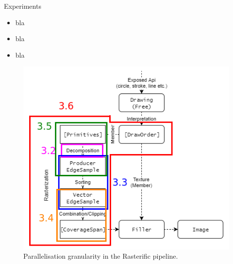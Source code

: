 \documentclass[slidestop,compress,mathserif, xcolor=table]{beamer}
\begin{document}
\begin{frame}[c]{Experiments}
  \begin{itemize}
  \item bla
  \item bla
  \item bla
  \end{itemize}

  \begin{figure}[H]
  \centering
  \includegraphics[width=.4\linewidth]{../rasterific-pipeline-flot}
  \caption{Parallelisation granularity in the Rasterific pipeline.}
  \label{fig:rasterific-pipeline-flot}
\end{figure}
\end{frame}
\end{document}

